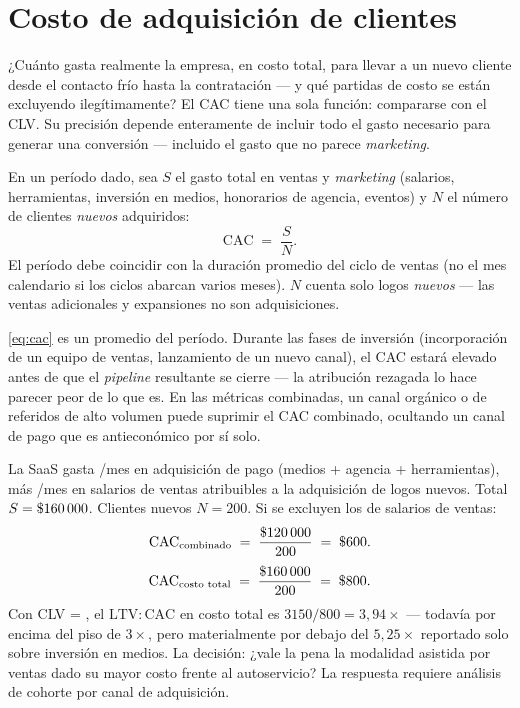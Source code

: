 \section{Costo de adquisición de clientes}\label{sec:cac}

¿Cuánto gasta realmente la empresa, en costo total, para llevar a un nuevo cliente desde el contacto frío hasta la contratación --- y qué partidas de costo se están excluyendo ilegítimamente? El CAC tiene una sola función: compararse con el CLV. Su precisión depende enteramente de incluir todo el gasto necesario para generar una conversión --- incluido el gasto que no parece \emph{marketing}.

En un período dado, sea \(S\) el gasto total en ventas y \emph{marketing} (salarios, herramientas, inversión en medios, honorarios de agencia, eventos) y \(N\) el número de clientes \emph{nuevos} adquiridos:
\begin{equation}\label{eq:cac}
  \mathrm{CAC} \;=\; \frac{S}{N} .
\end{equation}
El período debe coincidir con la duración promedio del ciclo de ventas (no el mes calendario si los ciclos abarcan varios meses). \(N\) cuenta solo logos \emph{nuevos} --- las ventas adicionales y expansiones no son adquisiciones.

\cref{eq:cac} es un promedio del período. Durante las fases de inversión (incorporación de un equipo de ventas, lanzamiento de un nuevo canal), el CAC estará elevado antes de que el \emph{pipeline} resultante se cierre --- la atribución rezagada lo hace parecer peor de lo que es. En las métricas combinadas, un canal orgánico o de referidos de alto volumen puede suprimir el CAC combinado, ocultando un canal de pago que es antieconómico por sí solo.

\begin{example}
La SaaS gasta /mes en adquisición de pago (medios + agencia + herramientas), más /mes en salarios de ventas atribuibles a la adquisición de logos nuevos. Total \(S = \$\num{160000}\). Clientes nuevos \(N = 200\). Si se excluyen los  de salarios de ventas:
\[
  \mathrm{CAC}_{\text{combinado}} \;=\; \frac{\$\num{120000}}{200} \;=\; \$\num{600}.
\]
\[
  \mathrm{CAC}_{\text{costo\ total}} \;=\; \frac{\$\num{160000}}{200} \;=\; \$\num{800}.
\]
Con CLV = , el \(\mathrm{LTV:CAC}\) en costo total es \(3150/800 = 3{,}94\times\) --- todavía por encima del piso de \(3\times\), pero materialmente por debajo del \(5{,}25\times\) reportado solo sobre inversión en medios. La decisión: ¿vale la pena la modalidad asistida por ventas dado su mayor costo frente al autoservicio? La respuesta requiere análisis de cohorte por canal de adquisición.
\end{example}

